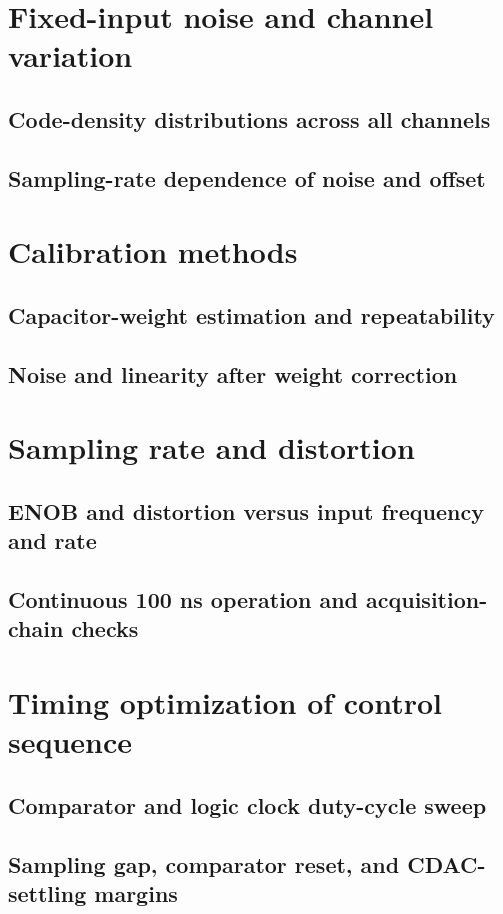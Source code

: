 \documentclass[PhD, UKenglish]{scrbook}
\begin{document}
\clearpage

\section{Fixed-input noise and channel variation}
\subsection{Code-density distributions across all channels}
\subsection{Sampling-rate dependence of noise and offset}

\section{Calibration methods}
\subsection{Capacitor-weight estimation and repeatability}
\subsection{Noise and linearity after weight correction}

\section{Sampling rate and distortion}
\subsection{ENOB and distortion versus input frequency and rate}
\subsection{Continuous 100 ns operation and acquisition-chain checks}

\section{Timing optimization of control sequence}
\subsection{Comparator and logic clock duty-cycle sweep}
\subsection{Sampling gap, comparator reset, and CDAC-settling margins}
\end{document}
